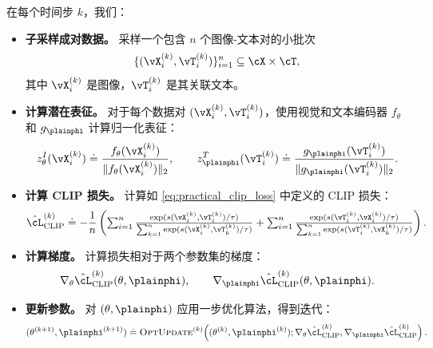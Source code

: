 \documentclass[../../book-main_zh.tex]{subfiles}
\begin{document}
在每个时间步 \(k\)，我们：
\begin{itemize}
    \item \textbf{子采样成对数据。} 采样一个包含 \(n\) 个图像-文本对的小批次
    \[
        \{(\vX_i^{(k)}, \vT_i^{(k)})\}_{i=1}^{n} \subseteq \cX \times \cT,
    \]
    其中 \(\vX_i^{(k)}\) 是图像，\(\vT_i^{(k)}\) 是其关联文本。

    \item \textbf{计算潜在表征。} 对于每个数据对 \((\vX_i^{(k)}, \vT_i^{(k)})\)，使用视觉和文本编码器 \(f_{\theta}\) 和 \(g_{\plainphi}\) 计算归一化表征：
    \begin{equation}
        z_{\theta}^{I}(\vX_i^{(k)}) \doteq \frac{f_{\theta}(\vX_i^{(k)})}{\|f_{\theta}(\vX_i^{(k)})\|_2},
        \qquad
        z_{\plainphi}^{T}(\vT_i^{(k)}) \doteq \frac{g_{\plainphi}(\vT_i^{(k)})}{\|g_{\plainphi}(\vT_i^{(k)})\|_2}.
    \end{equation}

    \item \textbf{计算 CLIP 损失。} 计算如 \eqref{eq:practical_clip_loss} 中定义的 CLIP 损失：
    \begin{equation}
        \hat{\cL}_{\text{CLIP}}^{(k)}
        \doteq
        -\frac{1}{n}\left(
        \textstyle
        \sum_{i=1}^{n}
        \frac{\exp(s(\vX_i^{(k)},\vT_i^{(k)})/\tau)}{\sum_{k=1}^{n}\exp(s(\vX_i^{(k)},\vT_k^{(k)})/\tau)}
        +
        \sum_{i=1}^{n}
        \frac{\exp(s(\vT_i^{(k)},\vX_i^{(k)})/\tau)}{\sum_{k=1}^{n}\exp(s(\vT_i^{(k)},\vX_k^{(k)})/\tau)}
        \right).
    \end{equation}

    \item \textbf{计算梯度。} 计算损失相对于两个参数集的梯度：
    \begin{equation}
        \nabla_{\theta}\hat{\cL}_{\text{CLIP}}^{(k)}(\theta,\plainphi),
        \qquad
        \nabla_{\plainphi}\hat{\cL}_{\text{CLIP}}^{(k)}(\theta,\plainphi).
    \end{equation}

    \item \textbf{更新参数。} 对 \((\theta,\plainphi)\) 应用一步优化算法，得到迭代：
    \begin{equation}
        (\theta^{(k+1)}, \plainphi^{(k+1)})
        \doteq
        \textsc{OptUpdate}^{(k)}\!\left(
        (\theta^{(k)}, \plainphi^{(k)});
        \nabla_{\theta}\hat{\cL}_{\text{CLIP}}^{(k)},
        \nabla_{\plainphi}\hat{\cL}_{\text{CLIP}}^{(k)}
        \right).
    \end{equation}
\end{itemize}
\end{document}
